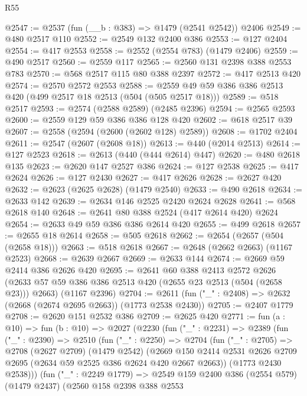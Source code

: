 \begin{lexlean}{R55}
\begin{coremodule}
@2547 := @2537 (fun (__b : @383) => @1479 (@2541 @2542)) @2406
@2549 := @480 @2517 @110
@2552 := @2549 @132 @2400 @386
@2553 := @127 @2404
@2554 := @417 @2553
@2558 := @2552 (@2554 @783) (@1479 @2406)
@2559 := @490 @2517
@2560 := @2559 @117
@2565 := @2560 @131 @2398 @388 @2553 @783
@2570 := @568 @2517 @115 @80 @388 @2397
@2572 := @417 @2513 @420
@2574 := @2570 @2572 @2553
@2588 := @2559 @49 @59 @386 @386 @2513 @420 (@499 @2517 @18 @2513 (@504 (@505 @2517 @18)))
@2589 := @518 @2517
@2593 := @2574 (@2588 @2589) (@2485 @2396)
@2594 := @2565 @2593
@2600 := @2559 @129 @59 @386 @386 @128 @420
@2602 := @618 @2517 @39
@2607 := @2558 (@2594 (@2600 (@2602 @128) @2589))
@2608 := @1702 @2404
@2611 := @2547 (@2607 (@2608 @18))
@2613 := @440 (@2014 @2513)
@2614 := @127 @2523
@2618 := @2613 (@440 (@444 @2614) @447)
@2620 := @480 @2618 @135
@2623 := @2620 @147 @2527 @386
@2624 := @127 @2538
@2625 := @417 @2624
@2626 := @127 @2430
@2627 := @417 @2626
@2628 := @2627 @420
@2632 := @2623 (@2625 @2628) (@1479 @2540)
@2633 := @490 @2618
@2634 := @2633 @142
@2639 := @2634 @146 @2525 @2420 @2624 @2628
@2641 := @568 @2618 @140
@2648 := @2641 @80 @388 @2524 (@417 @2614 @420) @2624
@2654 := @2633 @49 @59 @386 @386 @2614 @420
@2655 := @499 @2618
@2657 := @2655 @18 @2614
@2658 := @505 @2618
@2662 := @2654 (@2657 (@504 (@2658 @18)))
@2663 := @518 @2618
@2667 := @2648 (@2662 @2663) (@1167 @2523)
@2668 := @2639 @2667
@2669 := @2633 @144
@2674 := @2669 @59 @2414 @386 @2626 @420
@2695 := @2641
    @60
    @388
    @2413
    @2572
    @2626
    (@2633 @57 @59 @386 @386 @2513 @420 (@2655 @23 @2513 (@504 (@2658 @23))) @2663)
    (@1167 @2396)
@2704 := @2611 (fun ("_" : @2408) => @2632 (@2668 (@2674 @2695 @2663)) (@1773 @2538 @2430))
@2705 := @2407 @1779
@2708 := @2620 @151 @2532 @386
@2709 := @2625 @420
@2771 := fun (a : @10) =>
  fun (b : @10) =>
  @2027
    (@2230
      (fun ("_" : @2231) =>
      @2389
        (fun ("_" : @2390) =>
        @2510
          (fun ("_" : @2250) =>
          @2704
            (fun ("_" : @2705) =>
            @2708
              (@2627 @2709)
              (@1479 @2542)
              (@2669
                @150
                @2414
                @2531
                @2626
                @2709
                @2695
                (@2634 @59 @2525 @386 @2624 @420 @2667 @2663))
              (@1773 @2430 @2538)))
          (fun ("_" : @2249 @1779) =>
          @2549
            @159
            @2400
            @386
            (@2554 @579)
            (@1479 @2437)
            (@2560
              @158
              @2398
              @388
              @2553

\end{coremodule}
\end{lexlean}
